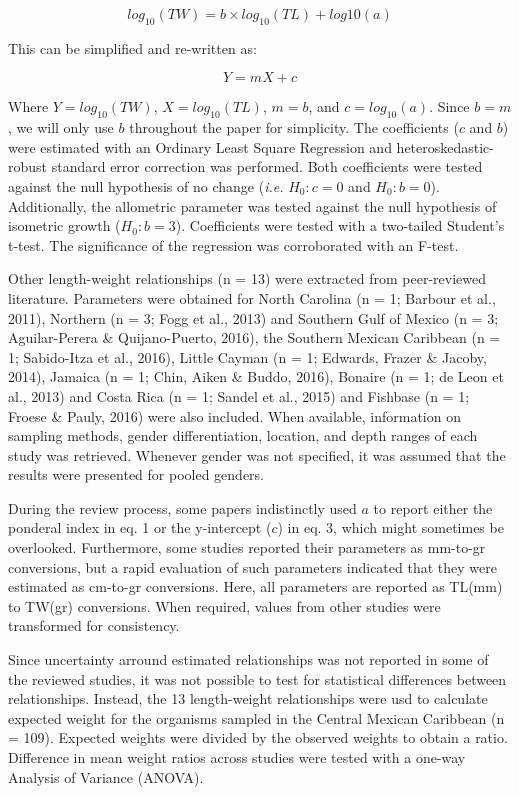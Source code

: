 \documentclass[12pt,]{article}
\begin{document}
\[log_{10}(TW) = b\times log_{10}(TL) + log{10}(a)\]

This can be simplified and re-written as:

\[Y = mX + c\]

Where \(Y = log_{10}(TW)\), \(X = log_{10}(TL)\), \(m = b\), and
\(c = log_{10}(a)\). Since \(b = m\), we will only use \(b\) throughout
the paper for simplicity. The coefficients (\(c\) and \(b\)) were
estimated with an Ordinary Least Square Regression and
heteroskedastic-robust standard error correction was performed. Both
coefficients were tested against the null hypothesis of no change
(\emph{i.e.} \(H_0: c = 0\) and \(H_0: b = 0\)). Additionally, the
allometric parameter was tested against the null hypothesis of isometric
growth (\(H_0: b = 3\)). Coefficients were tested with a two-tailed
Student's t-test. The significance of the regression was corroborated
with an F-test.

Other length-weight relationships (n = 13) were extracted from
peer-reviewed literature. Parameters were obtained for North Carolina (n
= 1; Barbour et al., 2011), Northern (n = 3; Fogg et al., 2013) and
Southern Gulf of Mexico (n = 3; Aguilar-Perera \& Quijano-Puerto, 2016),
the Southern Mexican Caribbean (n = 1; Sabido-Itza et al., 2016), Little
Cayman (n = 1; Edwards, Frazer \& Jacoby, 2014), Jamaica (n = 1; Chin,
Aiken \& Buddo, 2016), Bonaire (n = 1; de Leon et al., 2013) and Costa
Rica (n = 1; Sandel et al., 2015) and Fishbase (n = 1; Froese \& Pauly,
2016) were also included. When available, information on sampling
methods, gender differentiation, location, and depth ranges of each
study was retrieved. Whenever gender was not specified, it was assumed
that the results were presented for pooled genders.

During the review process, some papers indistinctly used \(a\) to report
either the ponderal index in eq. 1 or the y-intercept (\(c\)) in eq. 3,
which might sometimes be overlooked. Furthermore, some studies reported
their parameters as mm-to-gr conversions, but a rapid evaluation of such
parameters indicated that they were estimated as cm-to-gr conversions.
Here, all parameters are reported as TL(mm) to TW(gr) conversions. When
required, values from other studies were transformed for consistency.

Since uncertainty arround estimated relationships was not reported in
some of the reviewed studies, it was not possible to test for
statistical differences between relationships. Instead, the 13
length-weight relationships were usd to calculate expected weight for
the organisms sampled in the Central Mexican Caribbean (n = 109).
Expected weights were divided by the observed weights to obtain a ratio.
Difference in mean weight ratios across studies were tested with a
one-way Analysis of Variance (ANOVA).
\end{document}
